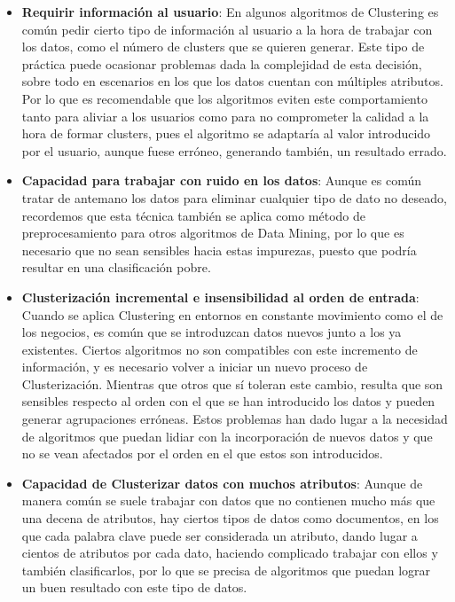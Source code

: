 \documentclass[3p,twocolumn]{elsarticle}
\begin{document}
\begin{itemize}
  \item \textbf{Requirir información al usuario}: En algunos algoritmos de Clustering es común pedir cierto tipo de información al usuario a la hora de trabajar con los datos, como el número de clusters que se quieren generar. Este tipo de práctica puede ocasionar problemas dada la complejidad de esta decisión, sobre todo en escenarios en los que los datos cuentan con múltiples atributos. Por lo que es recomendable que los algoritmos eviten este comportamiento tanto para aliviar a los usuarios como para no comprometer la calidad a la hora de formar clusters, pues el algoritmo se adaptaría al valor introducido por el usuario, aunque fuese erróneo, generando también, un resultado errado.
  
  \item \textbf{Capacidad para trabajar con ruido en los datos}: Aunque es común tratar de antemano los datos para eliminar cualquier tipo de dato no deseado, recordemos que esta técnica también se aplica como método de preprocesamiento para otros algoritmos de Data Mining, por lo que es necesario que no sean sensibles hacia estas impurezas, puesto que podría resultar en una clasificación pobre.
  
  \item \textbf{Clusterización incremental e insensibilidad al orden de entrada}: Cuando se aplica Clustering en entornos en constante movimiento como el de los negocios, es común que se introduzcan datos nuevos junto a los ya existentes. Ciertos algoritmos no son compatibles con este incremento de información, y es necesario volver a iniciar un nuevo proceso de Clusterización. Mientras que otros que sí toleran este cambio, resulta que son sensibles respecto al orden con el que se han introducido los datos y pueden generar agrupaciones erróneas. Estos problemas han dado lugar a la necesidad de algoritmos que puedan lidiar con la incorporación de nuevos datos y que no se vean afectados por el orden en el que estos son introducidos.
  
  \item \textbf{Capacidad de Clusterizar datos con muchos atributos}: Aunque de manera común se suele trabajar con datos que no contienen mucho más que una decena de atributos, hay ciertos tipos de datos como documentos, en los que cada palabra clave puede ser considerada un atributo, dando lugar a cientos de atributos por cada dato, haciendo complicado trabajar con ellos y también clasificarlos, por lo que se precisa de algoritmos que puedan lograr un buen resultado con este tipo de datos.
  

\end{itemize}
\end{document}
